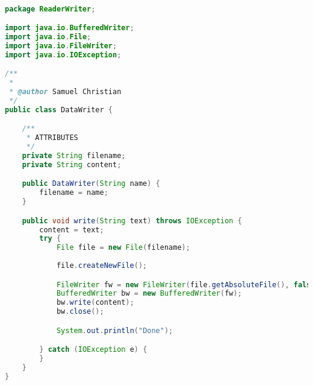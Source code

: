 \begin{lstlisting}[language=Java,basicstyle=\tiny,caption=DataWriter.java]

package ReaderWriter;

import java.io.BufferedWriter;
import java.io.File;
import java.io.FileWriter;
import java.io.IOException;

/**
 *
 * @author Samuel Christian
 */
public class DataWriter {

    /**
     * ATTRIBUTES
     */
    private String filename;
    private String content;

    public DataWriter(String name) {
        filename = name;
    }

    public void write(String text) throws IOException {
        content = text;
        try {
            File file = new File(filename);
            
            file.createNewFile();

            FileWriter fw = new FileWriter(file.getAbsoluteFile(), false);
            BufferedWriter bw = new BufferedWriter(fw);
            bw.write(content);
            bw.close();

            System.out.println("Done");

        } catch (IOException e) {
        }
    }
}

\end{lstlisting}

